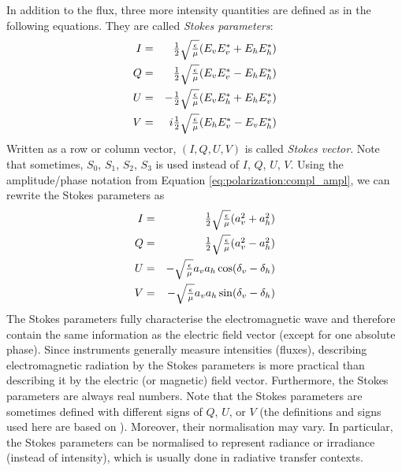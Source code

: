 In addition to the flux, three more intensity quantities
are defined as in the following equations. They are called 
\emph{Stokes parameters}:
\begin{eqnarray}
  \label{eq:polarization:stokesparam_I}
  I &=& \textstyle\frac{1}{2}\sqrt{\textstyle{\frac{\epsilon}{\mu}}} ( E_v E_v^\ast + E_h E_h^\ast ) \\
  \label{eq:polarization:stokesparam_Q}
  Q &=&  \textstyle\frac{1}{2}\sqrt{\textstyle{\frac{\epsilon}{\mu}}} (  E_v E_v^\ast - E_h E_h^\ast ) \\
  \label{eq:polarization:stokesparam_U}
  U &=& - \textstyle\frac{1}{2}\sqrt{\textstyle{\frac{\epsilon}{\mu}}} (  E_v E_h^\ast + E_h E_v^\ast ) \\
  \label{eq:polarization:stokesparam_V}
  V &=& i \textstyle\frac{1}{2}\sqrt{\textstyle{\frac{\epsilon}{\mu}}} (E_h E_v^\ast - E_v E_h^\ast )
\end{eqnarray}
Written as a row or column vector, $(I,Q,U,V)$ is called
\emph{Stokes vector}. Note that sometimes, $S_0$, $S_1$, $S_2$, $S_3$
is used instead of $I$, $Q$, $U$, $V$.
Using the amplitude/phase notation from
Equation \ref{eq:polarization:compl_ampl},
we can rewrite the Stokes parameters as 
\begin{eqnarray}
  \label{eq:polarization:stokesparam_alt_I}
 I &=&  \textstyle\frac{1}{2}\sqrt{\textstyle{\frac{\epsilon}{\mu}}} (a_v^2 + a_h^2)\\
  \label{eq:polarization:stokesparam_alt_Q}
 Q &=& \textstyle\frac{1}{2}\sqrt{\textstyle{\frac{\epsilon}{\mu}}} (a_v^2 - a_h^2)\\
  \label{eq:polarization:stokesparam_alt_U}
 U &=&  - \sqrt{\textstyle{\frac{\epsilon}{\mu}}} a_v a_h \cos(\delta_v-\delta_h)\\
  \label{eq:polarization:stokesparam_alt_V}
 V &=&   - \sqrt{\textstyle{\frac{\epsilon}{\mu}}}  a_v a_h \sin(\delta_v-\delta_h)
\end{eqnarray}
The Stokes parameters fully characterise the electromagnetic wave and
therefore contain the same information as the electric field vector
(except for one absolute phase).  Since instruments generally measure
intensities (fluxes), describing electromagnetic radiation by the
Stokes parameters is more practical than describing it by the electric
(or magnetic) field vector. Furthermore, the Stokes parameters are
always real numbers.  Note that the Stokes parameters are sometimes
defined with different signs of $Q$, $U$, or $V$ (the definitions and
signs used here are based on
\citet{mishchenko00:_light_scatt_nonsp_partic}). Moreover, their
normalisation may vary. In particular, the Stokes parameters can be
normalised to represent radiance or irradiance (instead of intensity),
which is usually done in radiative transfer contexts.
 
